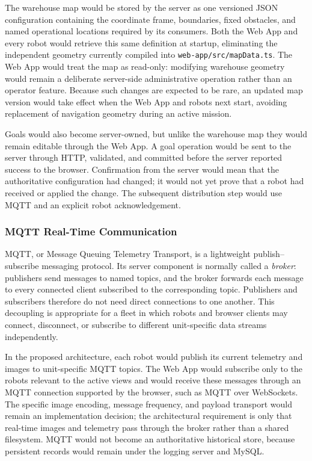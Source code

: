 The warehouse map would be stored by the server as one versioned JSON configuration containing the coordinate frame, boundaries, fixed obstacles, and named operational locations required by its consumers. Both the Web App and every robot would retrieve this same definition at startup, eliminating the independent geometry currently compiled into \texttt{web-app/src/mapData.ts}. The Web App would treat the map as read-only: modifying warehouse geometry would remain a deliberate server-side administrative operation rather than an operator feature. Because such changes are expected to be rare, an updated map version would take effect when the Web App and robots next start, avoiding replacement of navigation geometry during an active mission.

Goals would also become server-owned, but unlike the warehouse map they would remain editable through the Web App. A goal operation would be sent to the server through HTTP, validated, and committed before the server reported success to the browser. Confirmation from the server would mean that the authoritative configuration had changed; it would not yet prove that a robot had received or applied the change. The subsequent distribution step would use MQTT and an explicit robot acknowledgement.

\subsubsection{MQTT Real-Time Communication}

MQTT, or Message Queuing Telemetry Transport, is a lightweight publish--subscribe messaging protocol. Its server component is normally called a \emph{broker}: publishers send messages to named topics, and the broker forwards each message to every connected client subscribed to the corresponding topic. Publishers and subscribers therefore do not need direct connections to one another. This decoupling is appropriate for a fleet in which robots and browser clients may connect, disconnect, or subscribe to different unit-specific data streams independently.

In the proposed architecture, each robot would publish its current telemetry and images to unit-specific MQTT topics. The Web App would subscribe only to the robots relevant to the active views and would receive these messages through an MQTT connection supported by the browser, such as MQTT over WebSockets. The specific image encoding, message frequency, and payload transport would remain an implementation decision; the architectural requirement is only that real-time images and telemetry pass through the broker rather than a shared filesystem. MQTT would not become an authoritative historical store, because persistent records would remain under the logging server and MySQL.

